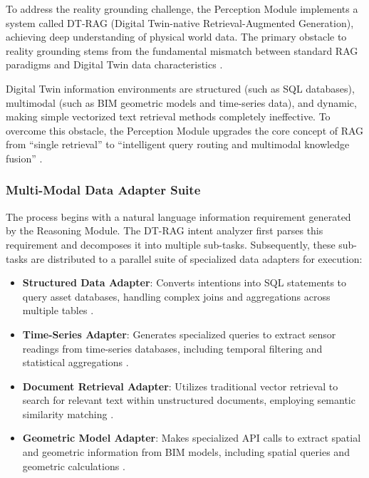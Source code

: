 To address the reality grounding challenge, the Perception Module implements a system called DT-RAG (Digital Twin-native Retrieval-Augmented Generation), achieving deep understanding of physical world data. The primary obstacle to reality grounding stems from the fundamental mismatch between standard RAG paradigms and Digital Twin data characteristics \cite{lewis2020retrieval}.

Digital Twin information environments are structured (such as SQL databases), multimodal (such as BIM geometric models and time-series data), and dynamic, making simple vectorized text retrieval methods completely ineffective. To overcome this obstacle, the Perception Module upgrades the core concept of RAG from ``single retrieval'' to ``intelligent query routing and multimodal knowledge fusion'' \cite{gao2023retrieval}.

\subsubsection{Multi-Modal Data Adapter Suite}

The process begins with a natural language information requirement generated by the Reasoning Module. The DT-RAG intent analyzer first parses this requirement and decomposes it into multiple sub-tasks. Subsequently, these sub-tasks are distributed to a parallel suite of specialized data adapters for execution:

\begin{itemize}
\item \textbf{Structured Data Adapter}: Converts intentions into SQL statements to query asset databases, handling complex joins and aggregations across multiple tables \cite{scholak2021duorat}.
\item \textbf{Time-Series Adapter}: Generates specialized queries to extract sensor readings from time-series databases, including temporal filtering and statistical aggregations \cite{yue2022ts2vec}.
\item \textbf{Document Retrieval Adapter}: Utilizes traditional vector retrieval to search for relevant text within unstructured documents, employing semantic similarity matching \cite{karpukhin2020dense}.
\item \textbf{Geometric Model Adapter}: Makes specialized API calls to extract spatial and geometric information from BIM models, including spatial queries and geometric calculations \cite{boje2020towards}.
\end{itemize}

